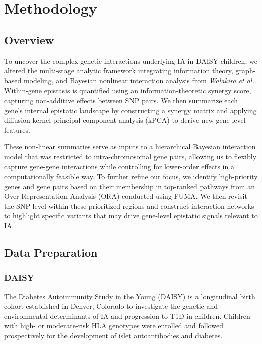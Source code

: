 \documentclass{article}\usepackage[]{graphicx}\usepackage[]{color}
\begin{document}
\section{Methodology}
\label{sec:meth}

\subsection{Overview}
\label{sec:meth-over}

To uncover the complex genetic interactions underlying IA in DAISY children, we altered the multi-stage analytic framework integrating information theory, graph-based modeling, and Bayesian nonlinear interaction analysis from \textit{Walakira et al.}\cite{walakiraDetectingGeneGene2022}. Within-gene epistasis is quantified using an information-theoretic synergy score, capturing non-additive effects between SNP pairs. We then summarize each gene’s internal epistatic landscape by constructing a synergy matrix and applying diffusion kernel principal component analysis (kPCA) to derive new gene-level features.
\par
These non-linear summaries serve as inputs to a hierarchical Bayesian interaction model that was restricted to intra-chromosomal gene pairs, allowing us to flexibly capture gene-gene interactions while controlling for lower-order effects in a computationally feasible way. To further refine our focus, we identify high-priority genes and gene pairs based on their membership in top-ranked pathways from an Over-Representation Analysis (ORA) conducted using FUMA\cite{watanabeFunctionalMappingAnnotation2017}. We then revisit the SNP level within these prioritized regions and construct interaction networks to highlight specific variants that may drive gene-level epistatic signals relevant to IA.

\subsection{Data Preparation}
\label{sec:dataprep}
\subsubsection{DAISY}
The Diabetes Autoimmunity Study in the Young (DAISY) is a longitudinal birth cohort established in Denver, Colorado to investigate the genetic and environmental determinants of IA and progression to T1D in children. Children with high- or moderate-risk HLA genotypes were enrolled and followed prospectively for the development of islet autoantibodies and diabetes\cite{rewersNewbornScreeningHLA1996a}.
\end{document}
